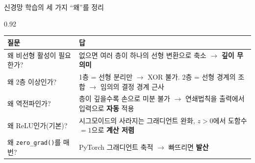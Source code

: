 \begin{frame}{신경망 학습의 세 가지 ``왜''를 정리}
\begin{center}\begin{varwidth}{0.92\textwidth}
  \small
  \begin{tabular}{@{}p{}p{}@{}}
    \toprule
    질문 & 답 \\
    \midrule
    왜 비선형 활성이 필요한가? & 없으면 여러 층이 하나의 선형 변환으로
      축소 $\to$ \textbf{깊이 무의미} \\
    왜 2층 이상인가? & 1층 = 선형 분리만 $\to$ XOR 불가.
      2층 = 선형 경계의 조합 $\to$ 임의의 결정 경계 근사 \\
    왜 역전파인가? & 층이 깊을수록 손으로 미분 불가 $\to$
      연쇄법칙을 출력에서 입력으로 \textbf{자동} 적용 \\
    왜 ReLU인가(기본)? & 시그모이드의 사라지는 그래디언트 완화,
      $z>0$에서 도함수 $= 1$으로 \textbf{계산 저렴} \\
    왜 \texttt{zero\_grad()}를 매번? & PyTorch 그래디언트 축적
      $\to$ 빠뜨리면 \textbf{발산} \\
    \bottomrule
  \end{tabular}
\end{varwidth}\end{center}
\end{frame}

